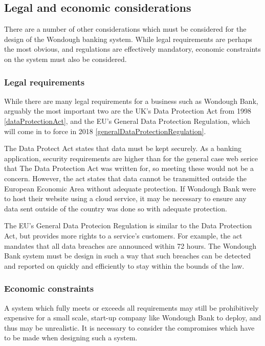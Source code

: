 \begin{longtable}{|| p{} | p{} ||}
\end{longtable}

\subsection{Legal and economic considerations}

There are a number of other considerations which must be considered for the design of the Wondough banking system. While legal requirements are perhaps the most obvious, and regulations are effectively mandatory, economic constraints on the system must also be considered.

\subsubsection{Legal requirements}

While there are many legal requirements for a business such as Wondough Bank, arguably the most important two are the UK's Data Protection Act from 1998 \ref{dataProtectionAct}, and the EU's General Data Protection Regulation, which will come in to force in 2018 \ref{generalDataProtectionRegulation}. 

The Data Protect Act states that data must be kept securely. As a banking application, security requirements are higher than for the general case web serice that The Data Protection Act was written for, so meeting these would not be a concern. However, the act states that data cannot be transmitted outside the European Economic Area without adequate protection. If Wondough Bank were to host their website using a cloud service, it may be necessary to ensure any data sent outside of the country was done so with adequate protection.

The EU's General Data Protecion Regulation is similar to the Data Protection Act, but provides more rights to a service's customers. For example, the act mandates that all data breaches are announced within 72 hours. The Wondough Bank system must be design in such a way that such breaches can be detected and reported on quickly and efficiently to stay within the bounds of the law.

\subsubsection{Economic constraints}

A system which fully meets or exceeds all requirements may still be prohibitively expensive for a small scale, start-up company like Wondough Bank to deploy, and thus may be unrealistic. It is necessary to consider the compromises which have to be made when designing such a system. 

